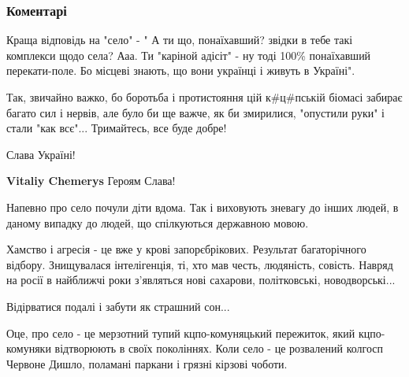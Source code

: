  
 
 
 
 
\subsubsection{Коментарі}
\label{sec:24_10_2021.fb.bryhar_sergej.1.pesochnica_jazyk_mova.cmt}

\begin{itemize} %

Краща відповідь на "село" - " А ти що, понаїхавший? звідки в тебе такі
комплекси щодо села? Ааа. Ти "каріной адісіт" - ну тоді 100\% понаїхавший
перекати-поле. Бо місцеві знають, що вони українці і живуть в Україні".


Так, звичайно важко, бо боротьба і протистояння цій к\#ц\#пській біомасі забирає
багато сил і нервів, але було би ще важче, як би змирилися, "опустили руки" і
стали "как всє"... Тримайтесь, все буде добре!

Слава Україні!

\begin{itemize} %
\textbf{Vitaliy Chemerys} Героям Слава!
\end{itemize} %

Напевно про село почули діти вдома. Так і виховують зневагу до інших людей, в даному випадку до людей, що спілкуються державною мовою.


Хамство і агресія - це вже у крові запорєбрікових. Результат багаторічного
відбору. Знищувалася інтелігенція, ті, хто мав честь, людяність, совість.
Навряд на росії в найближчі роки з'являться нові сахарови, політковські,
новодворські...

Відірватися подалі і забути як страшний сон...


Оце, про село - це мерзотний тупий кцпо-комуняцький пережиток, який
кцпо-комуняки відтворюють в своїх поколіннях. Коли село - це розвалений колгосп
Червоне Дишло, поламані паркани і грязні кірзові чоботи.


\end{itemize}
